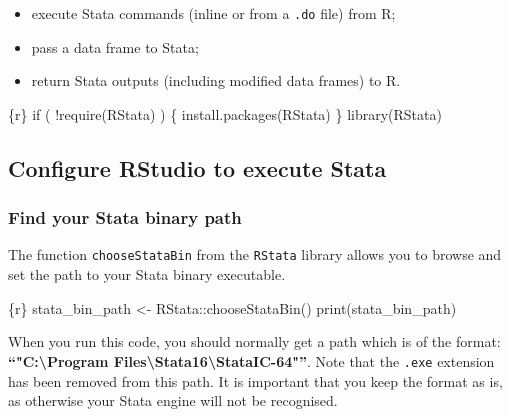 \documentclass[
  letterpaper,
  DIV=11,
  numbers=noendperiod,
  oneside]{scrreprt}
\newenvironment{Shaded}{\begin{snugshade}}{\end{snugshade}}
\newcommand{\ControlFlowTok}[1]{\textcolor[rgb]{0.00,0.23,0.31}{#1}}
\newcommand{\FunctionTok}[1]{\textcolor[rgb]{0.28,0.35,0.67}{#1}}
\newcommand{\InformationTok}[1]{\textcolor[rgb]{0.37,0.37,0.37}{#1}}
\newcommand{\NormalTok}[1]{\textcolor[rgb]{0.00,0.23,0.31}{#1}}
\newcommand{\OtherTok}[1]{\textcolor[rgb]{0.00,0.23,0.31}{#1}}
\newcommand{\SpecialCharTok}[1]{\textcolor[rgb]{0.37,0.37,0.37}{#1}}
\newcommand{\StringTok}[1]{\textcolor[rgb]{0.13,0.47,0.30}{#1}}
\providecommand{\tightlist}{%
  \setlength{\itemsep}{0pt}\setlength{\parskip}{0pt}}\usepackage{longtable,booktabs,array}
\begin{document}
\begin{itemize}
\tightlist
\item
  execute Stata commands (inline or from a \texttt{.do} file) from R;
\item
  pass a data frame to Stata;
\item
  return Stata outputs (including modified data frames) to R.
\end{itemize}

\begin{Shaded}
\begin{Highlighting}[]
\InformationTok{\textasciigrave{}\textasciigrave{}\textasciigrave{}\{r\}}
\ControlFlowTok{if}\NormalTok{ ( }\SpecialCharTok{!}\FunctionTok{require}\NormalTok{(RStata) ) \{}
  \FunctionTok{install.packages}\NormalTok{(}\StringTok{\textquotesingle{}RStata\textquotesingle{}}\NormalTok{)}
\NormalTok{\}}
\FunctionTok{library}\NormalTok{(RStata)}
\InformationTok{\textasciigrave{}\textasciigrave{}\textasciigrave{}}
\end{Highlighting}
\end{Shaded}

\hypertarget{configure-rstudio-to-execute-stata}{%
\subsection{Configure RStudio to execute
Stata}\label{configure-rstudio-to-execute-stata}}

\hypertarget{find-your-stata-binary-path}{%
\subsubsection{Find your Stata binary
path}\label{find-your-stata-binary-path}}

The function \texttt{chooseStataBin} from the \texttt{RStata} library
allows you to browse and set the path to your Stata binary executable.

\begin{Shaded}
\begin{Highlighting}[]
\InformationTok{\textasciigrave{}\textasciigrave{}\textasciigrave{}\{r\}}
\NormalTok{stata\_bin\_path }\OtherTok{\textless{}{-}}\NormalTok{ RStata}\SpecialCharTok{::}\FunctionTok{chooseStataBin}\NormalTok{()}
\FunctionTok{print}\NormalTok{(stata\_bin\_path)}
\InformationTok{\textasciigrave{}\textasciigrave{}\textasciigrave{}}
\end{Highlighting}
\end{Shaded}

When you run this code, you should normally get a path which is of the
format: \textbf{``"C:\textbackslash Program
Files\textbackslash Stata16\textbackslash StataIC-64"''}. Note that the
\texttt{.exe} extension has been removed from this path. It is important
that you keep the format as is, as otherwise your Stata engine will not
be recognised.
\end{document}
